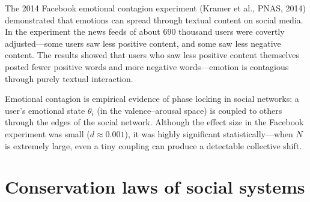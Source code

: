 \begin{example}
The 2014 Facebook emotional contagion experiment (Kramer et al., PNAS, 2014) demonstrated that emotions can spread through textual content on social media. In the experiment the news feeds of about $690$ thousand users were covertly adjusted---some users saw less positive content, and some saw less negative content. The results showed that users who saw less positive content themselves posted fewer positive words and more negative words---emotion is contagious through purely textual interaction.

Emotional contagion is empirical evidence of phase locking in social networks: a user's emotional state $\theta_i$ (in the valence--arousal space) is coupled to others through the edges of the social network. Although the effect size in the Facebook experiment was small ($d \approx 0.001$), it was highly significant statistically---when $N$ is extremely large, even a tiny coupling can produce a detectable collective shift.
\end{example}

\section{Conservation laws of social systems}

